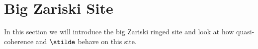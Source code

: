 \section{Big Zariski Site}
In this section we will introduce the big Zariski ringed site
and look at how quasi-coherence and $\stilde$ behave on this site.








